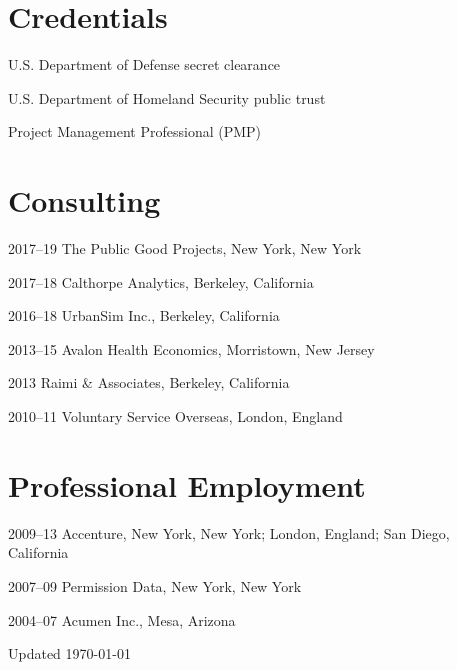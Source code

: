 \documentclass[11pt,letterpaper]{report}
\newcommand{\listitemspace}{0.25em}
\renewenvironment{itemize}
{\begin{list}{}{\setlength{\leftmargin}{0em}
                \setlength{\parskip}{0em}
                \setlength{\itemsep}{\listitemspace}
                \setlength{\parsep}{\listitemspace}}}
{\end{list}}
\begin{document}
    \section*{Credentials}

    \begin{itemize}

        \item U.S. Department of Defense secret clearance
        \item U.S. Department of Homeland Security public trust
        \item Project Management Professional (PMP)

    \end{itemize}



    \section*{Consulting}

    \begin{tablist}

        \item[2017--19] \tab{}The Public Good Projects, New York, New York
        \item[2017--18] \tab{}Calthorpe Analytics, Berkeley, California
        \item[2016--18] \tab{}UrbanSim Inc., Berkeley, California
        \item[2013--15] \tab{}Avalon Health Economics, Morristown, New Jersey
        \item[2013]     \tab{}Raimi \& Associates, Berkeley, California
        \item[2010--11] \tab{}Voluntary Service Overseas, London, England

    \end{tablist}



    \section*{Professional Employment}

    \begin{tablist}

        \item[2009--13] \tab{}Accenture, New York, New York; London, England; San Diego, California
        \item[2007--09] \tab{}Permission Data, New York, New York
        \item[2004--07] \tab{}Acumen Inc., Mesa, Arizona

    \end{tablist}



    \begin{center}
        \vfill
        Updated \monthyeardate\today
    \end{center}
\end{document}
